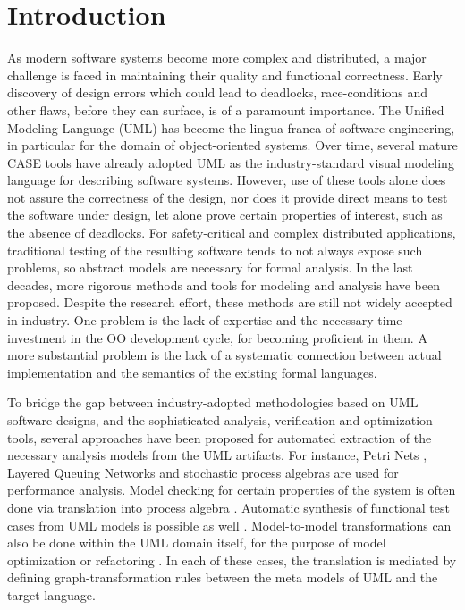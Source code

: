 \documentclass[letter]{llncs}
\newcommand{\secshrinkbegin}{\vspace{-.2cm}}
\begin{document}
\section{Introduction}
\label{sec:Introduction}
\secshrinkbegin
As modern software systems become more complex and distributed, a major
challenge is faced 
in maintaining their quality and functional correctness. Early discovery of
design errors which could
lead to deadlocks, race-conditions and other flaws, before they can surface,
is of a paramount importance.
The Unified Modeling Language (UML) \cite{UML2.4} has become the lingua franca
of software engineering, in particular for the domain of object-oriented
systems. Over time, several mature CASE tools have already adopted UML as the
industry-standard visual modeling language for describing software systems. 
However, use of these tools alone does not
assure the correctness of the design, nor does it provide direct means to test
the software under design,
let alone prove certain properties of interest, such as the absence of deadlocks. 
For safety-critical and complex
distributed applications, traditional testing of the resulting software tends 
to not always expose
such problems, so abstract models are necessary for formal analysis.  
In the last decades, more rigorous methods and tools for modeling and analysis
 have been proposed. Despite the research effort,
these methods are still not widely
accepted in industry. One problem is the lack of expertise and the necessary
time investment in the OO development cycle, for becoming proficient in them. 
A more substantial problem is the lack of a systematic connection between 
actual implementation and the semantics of the existing formal languages. 
\vspace{-14 pt}

To bridge the gap between industry-adopted methodologies based on UML
software designs, and the sophisticated analysis, verification and optimization tools, several approaches have been proposed for
automated extraction of the necessary analysis models from the UML artifacts. For instance, Petri
Nets \cite{DBLP:journals/tse/DistefanoSP11,Bernardi:2002:USD:584369.584376}, Layered 
Queuing Networks \cite{Petriu:2002:AUP:647810.737982}
and stochastic process algebras
\cite{Tribastone:2008:AEP:1383559.1383569,Tribastone:2008:ATU:1446304.1447447} are used for performance
analysis. Model checking for certain properties of the system is often done via
translation into process algebra
\cite{10.1109/APSEC.2005.7,inpJuDuJuLaPo06a}. Automatic synthesis of functional
test cases from UML models is possible as well
\cite{Bandyopadhyay:2009:TIG:1547558.1548197,Pickin02systemtest,Dinh-Trong:2006:SAG:1190616.1191226}. 
Model-to-model transformations
can also be done within the UML domain itself, for the purpose of model optimization or
refactoring \cite{Whittle:2002:TSM:647246.719610}.
In each of these cases, the translation is mediated by defining
graph-transformation rules between the meta models of UML and the target language.
\end{document}
